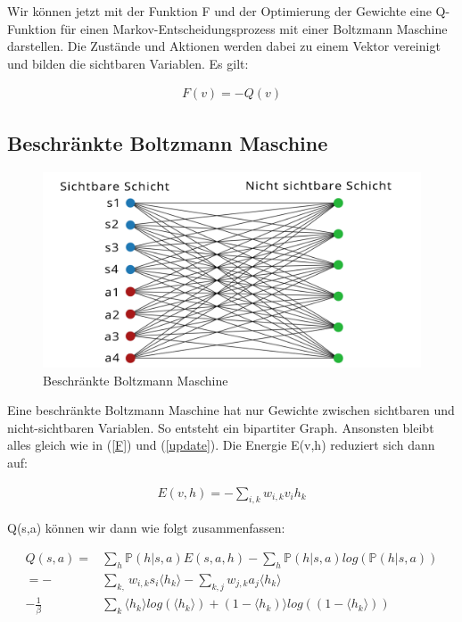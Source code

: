 Wir können jetzt mit der Funktion F und der Optimierung der Gewichte eine Q-Funktion für einen Markov-Entscheidungsprozess mit einer Boltzmann Maschine darstellen. Die Zustände und Aktionen werden dabei zu einem Vektor vereinigt und bilden die sichtbaren Variablen. Es gilt:

\begin{align}
	F(v) = - Q(v)
\end{align}

\subsection{Beschränkte Boltzmann Maschine}
\label{subsec:rbm}

\begin{figure}[hbt!]
\centering
\includegraphics[width=\textwidth]{Figures/rbm.png}
\caption{Beschränkte Boltzmann Maschine}
\label{police}
\end{figure}

Eine beschränkte Boltzmann Maschine hat nur Gewichte zwischen sichtbaren und nicht-sichtbaren Variablen. So entsteht ein bipartiter Graph. Ansonsten bleibt alles gleich wie in (\ref{F}) und (\ref{update}). Die Energie E(v,h) reduziert sich dann auf:

\begin{align}
	E(v,h) = - \sum_{i,k}w_{i,k}v_ih_k
\end{align}

Q(s,a) können wir dann wie folgt zusammenfassen:

\begin{align*}
	Q(s,a) 	= 		&\sum_{h}\mathbb{P}(h|s,a)E(s,a,h) - \sum_{h}\mathbb{P}(h|s,a)log(\mathbb{P}(h|s,a))  \\
			=  	- 	&\sum_{k, } w_{i,k}s_i \langle h_k \rangle - \sum_{k,j} w_{j,k}a_j \langle h_k \rangle  \\
	- 	\frac{1}{\beta} 	&\sum_{k} \langle h_k \rangle log(\langle h_k \rangle) + (1 -  \langle h_k) \rangle log( (1 - \langle h_k \rangle) ) 
\end{align*}

